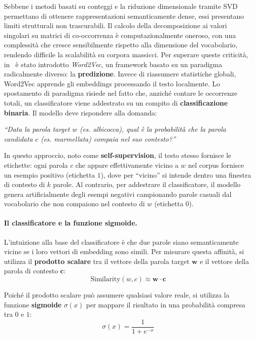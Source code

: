 Sebbene i metodi basati su conteggi e la riduzione dimensionale tramite SVD permettano di ottenere rappresentazioni semanticamente dense, essi presentano limiti strutturali non trascurabili. Il calcolo della decomposizione ai valori singolari su matrici di co-occorrenza è computazionalmente oneroso, con una complessità che cresce sensibilmente rispetto alla dimensione del vocabolario, rendendo difficile la scalabilità su corpora massicci.
Per superare queste criticità, in~\parencite{mikolov2013efficientestimationwordrepresentations} è stato introdotto \textit{Word2Vec}, un framework basato su un paradigma radicalmente diverso: la \textbf{predizione}. Invece di riassumere statistiche globali, Word2Vec apprende gli embeddings processando il testo localmente. Lo spostamento di paradigma risiede nel fatto che, anziché contare le occorrenze totali, un classificatore viene addestrato su un compito di \textbf{classificazione binaria}. Il modello deve rispondere alla domanda:
\begin{center}
\textit{``Data la parola target $w$ (es. \textit{albicocca}), qual è la probabilità che la parola candidata $c$ (es. \textit{marmellata}) compaia nel suo contesto?''}
\end{center}
In questo approccio, noto come \textbf{self-supervision}, il testo stesso fornisce le etichette: ogni parola $c$ che appare effettivamente vicino a $w$ nel corpus fornisce un esempio positivo (etichetta $1$), dove per ``vicino'' si intende dentro una finestra di contesto di $k$ parole. Al contrario, per addestrare il classificatore, il modello genera artificialmente degli esempi negativi campionando parole casuali dal vocabolario che non compaiono nel contesto di $w$ (etichetta $0$).
\paragraph{Il classificatore e la funzione sigmoide.}
L'intuizione alla base del classificatore è che due parole siano semanticamente vicine se i loro vettori di embedding sono simili. Per misurare questa affinità, si utilizza il \textbf{prodotto scalare} tra il vettore della parola target $\mathbf{w}$ e il vettore della parola di contesto $\mathbf{c}$:
\[
\text{Similarity}(w,c) \approx \mathbf{w} \cdot \mathbf{c}
\]

Poiché il prodotto scalare può assumere qualsiasi valore reale, si utilizza la funzione \textbf{sigmoide} $\sigma(x)$ per mappare il risultato in una probabilità compresa tra $0$ e $1$:
\begin{equation}
\sigma(x) = \frac{1}{1 + e^{-x}}
\end{equation}

